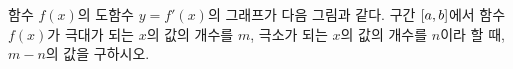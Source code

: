 함수 $f(x)$의 도함수 $y=f'(x)$의 그래프가 다음 그림과 같다. 구간 $[a{,}\mkern3mu\mathopen{}b]$에서 함수 $f(x)$가 극대가 되는 $x$의 값의 개수를 $m$, 극소가 되는 $x$의 값의 개수를 $n$이라 할 때, $m-n$의 값을 구하시오.
\par\smallskip\begin{center}\resizebox{\ifdim\width>\linewidth\linewidth\else\width\fi}{!}{}\end{center}
